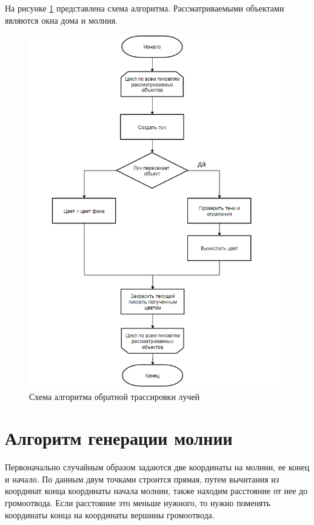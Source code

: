 На рисунке \ref{img:trac} представлена схема алгоритма. Рассматриваемыми объектами являются окна дома и молния.

\begin{figure}[H]
	\begin{center}
		\includegraphics[scale=0.88]{img/trac.png}
	\end{center}
	\captionsetup{justification=centering}
	\caption{Схема алгоритма обратной трассировки лучей }
	\label{img:trac}
\end{figure}

\section{Алгоритм генерации молнии}
Первоначально случайным образом задаются две координаты на молнии, ее конец и начало. По данным двум точками строится прямая, путем вычитания из координат конца координаты начала молнии, также находим расстояние от нее до громоотвода. Если расстояние это меньше нужного, то нужно поменять координаты конца на координаты вершины громоотвода.

